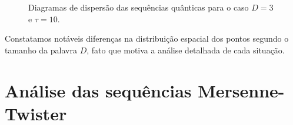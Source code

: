 \begin{figure}
	\centering
	\caption{Diagramas de dispersão das sequências quânticas para o caso $D=3$ e $\tau=10$.}\label{Fig:QuantD3tau10}
\end{figure}


Constatamos notáveis diferenças na distribuição espacial dos pontos segundo o tamanho da palavra $D$, fato que motiva a análise detalhada de cada situação.

\section{Análise das sequências Mersenne-Twister}




